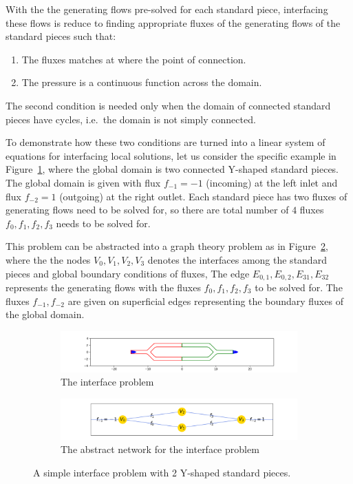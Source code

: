 \documentclass[10pt,twocolumn,letterpaper]{article}
\begin{document}
With the the generating flows pre-solved for each standard piece, 
interfacing these flows is reduce to finding 
appropriate fluxes of the generating flows of the standard pieces such that:
\begin{enumerate}
  \item The fluxes matches at where the point of connection\label{cond:flux-match}.
  \item The pressure is a continuous function across the domain.\label{cond:pressure}
\end{enumerate}
The second condition is needed only when the domain of connected standard pieces 
have cycles, i.e.\ the domain is not simply connected. 

To demonstrate how these two conditions are turned into 
a linear system of equations for interfacing local solutions, 
let us consider the specific example in Figure~\ref{fig:interface_problem_0}, where the global domain 
is two connected Y-shaped standard pieces. 
The global domain is given with flux $f_{-1} = -1$ (incoming) at the left inlet 
and flux $f_{-2}=1$ (outgoing) at the right outlet. 
Each standard piece has two fluxes of generating flows need to be solved for, 
so there are total number of $4$ fluxes $f_0,f_1,f_2,f_3$ needs to be solved for. 

This problem can be abstracted into a graph theory problem as in Figure~\ref{fig:interface_problem_1},
where the the nodes $V_0,V_1,V_2,V_3$ denotes the interfaces among the standard pieces 
and global boundary conditions of fluxes, 
The edge $E_{0,1},E_{0,2},E_{31},E_{32}$ represents the generating flows 
with the fluxes $f_0,f_1,f_2,f_3$ to be solved for. 
The fluxes $f_{-1},f_{-2}$ are given on superficial edges representing the boundary fluxes of the global domain.

\begin{figure}[h!]
  \centering
  \begin{subfigure}[b]{0.45\textwidth}
    \centering
    \includegraphics[width=\textwidth]{pic/simple-interface-problem.png}
    \caption{The interface problem}\label{fig:interface_problem_0}
  \end{subfigure}
  \begin{subfigure}[b]{0.45\textwidth}
    \centering
    \includegraphics[width=\textwidth]{pic/simple-interface-problem-network.png}
    \caption{The abstract network for the interface problem}\label{fig:interface_problem_1}
  \end{subfigure}
  \caption{A simple interface problem with 2 Y-shaped standard pieces.}\label{fig:simple-interface-problem}
\end{figure}
\end{document}
